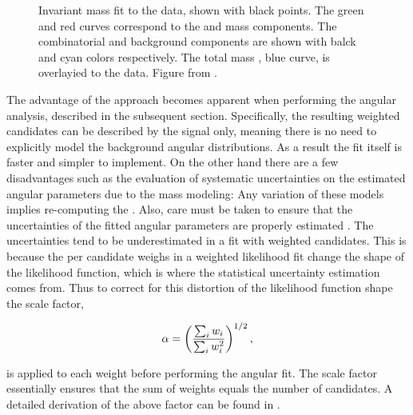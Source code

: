 \begin{figure}[t]
  \centering
  \scalebox{0.5}{}
  \caption{Invariant mass fit to the data, shown with black points. The green and red curves correspond to the \BdJpsiKst and
           \BsJpsiKst mass \pdf components. The combinatorial and \LbJpsipK background components are shown with balck and cyan
           colors respectively. The total mass \pdf, blue curve, is overlayied to the data. Figure from \cite{bsjpsikst-paper}. }
  \label{mass_plot}
\end{figure}

The advantage of the \sWeights approach becomes apparent when performing the angular analysis, described in the subsequent section.
Specifically, the resulting weighted candidates can be described by the signal \pdf only, meaning there is no need to explicitly model
the background angular distributions. As a result the fit itself is faster and simpler to implement. On the other hand there are a few
disadvantages such as the evaluation of systematic uncertainties on the estimated angular parameters due to the mass \pdf modeling:
Any variation of these models implies re-computing the \sWeights. Also, care must be taken to ensure that the uncertainties
of the fitted angular parameters are properly estimated \cite{splot}. The uncertainties tend to be underestimated in a fit
with weighted candidates. This is because the per candidate weighs in a weighted likelihood fit change the shape of the 
likelihood function, which is where the statistical uncertainty estimation comes from. 
Thus to correct for this distortion of the likelihood function shape the scale factor,

\begin{equation}
  \centering
  \alpha = \left(\frac{\sum_{i} w_i}{\sum_{i} w_i^2}\right)^{1/2},
  \label{sWeights_scale_factor}
\end{equation}

\noindent is applied to each weight before performing the angular fit. The scale factor essentially ensures that the sum of weights
equals the number of candidates. A detailed derivation of the above factor can be found in \cite{jeroenThesis}.
